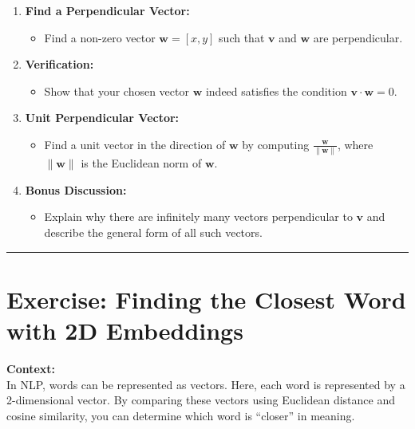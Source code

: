 \documentclass[
  letterpaper,
  DIV=11,
  numbers=noendperiod]{scrreprt}
\providecommand{\tightlist}{%
  \setlength{\itemsep}{0pt}\setlength{\parskip}{0pt}}\usepackage{longtable,booktabs,array}
\begin{document}
\begin{enumerate}
\def\labelenumi{\arabic{enumi}.}
\tightlist
\item
  \textbf{Find a Perpendicular Vector:}

  \begin{itemize}
  \tightlist
  \item
    Find a non-zero vector \(\mathbf{w} = [x, y]\) such that
    \(\mathbf{v}\) and \(\mathbf{w}\) are perpendicular.
  \end{itemize}
\item
  \textbf{Verification:}

  \begin{itemize}
  \tightlist
  \item
    Show that your chosen vector \(\mathbf{w}\) indeed satisfies the
    condition \(\mathbf{v} \cdot \mathbf{w} = 0\).
  \end{itemize}
\item
  \textbf{Unit Perpendicular Vector:}

  \begin{itemize}
  \tightlist
  \item
    Find a unit vector in the direction of \(\mathbf{w}\) by computing
    \(\frac{\mathbf{w}}{\|\mathbf{w}\|}\), where \(\|\mathbf{w}\|\) is
    the Euclidean norm of \(\mathbf{w}\).
  \end{itemize}
\item
  \textbf{Bonus Discussion:}

  \begin{itemize}
  \tightlist
  \item
    Explain why there are infinitely many vectors perpendicular to
    \(\mathbf{v}\) and describe the general form of all such vectors.
  \end{itemize}
\end{enumerate}

\begin{center}\rule{0.5\linewidth}{0.5pt}\end{center}

\section{Exercise: Finding the Closest Word with 2D
Embeddings}\label{exercise-finding-the-closest-word-with-2d-embeddings}

\textbf{Context:}\\
In NLP, words can be represented as vectors. Here, each word is
represented by a 2-dimensional vector. By comparing these vectors using
Euclidean distance and cosine similarity, you can determine which word
is ``closer'' in meaning.
\end{document}
